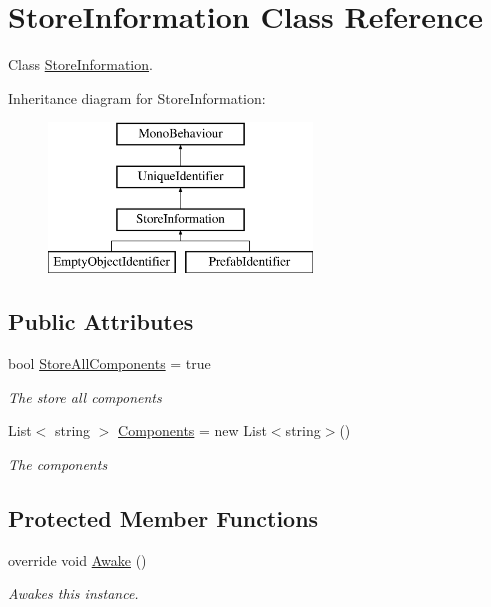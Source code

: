 \hypertarget{class_store_information}{}\section{Store\+Information Class Reference}
\label{class_store_information}


Class \hyperlink{class_store_information}{Store\+Information}.  


Inheritance diagram for Store\+Information\+:\begin{figure}[H]
\begin{center}
\leavevmode
\includegraphics[height=4.000000cm]{class_store_information}
\end{center}
\end{figure}
\subsection*{Public Attributes}
\begin{DoxyCompactItemize}
\item 
bool \hyperlink{class_store_information_aa4732e6bb5c4dcff1a7d7482c785b1f5}{Store\+All\+Components} = true
\begin{DoxyCompactList}\small\item\em The store all components \end{DoxyCompactList}\item 
List$<$ string $>$ \hyperlink{class_store_information_a0b1aa5065cb278253bc2f2cbff36bd6f}{Components} = new List$<$string$>$()
\begin{DoxyCompactList}\small\item\em The components \end{DoxyCompactList}\end{DoxyCompactItemize}
\subsection*{Protected Member Functions}
\begin{DoxyCompactItemize}
\item 
override void \hyperlink{class_store_information_a4a751814bad3a0171ba3aaaa19a6c8e7}{Awake} ()
\begin{DoxyCompactList}\small\item\em Awakes this instance. \end{DoxyCompactList}\end{DoxyCompactItemize}
